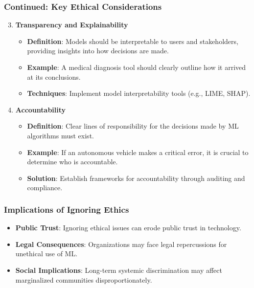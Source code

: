 \documentclass[aspectratio=169]{beamer}
\begin{document}
\begin{frame}[fragile]
    \frametitle{Continued: Key Ethical Considerations}
    \begin{enumerate}
        \setcounter{enumi}{2}
        \item \textbf{Transparency and Explainability}
            \begin{itemize}
                \item \textbf{Definition}: Models should be interpretable to users and stakeholders, providing insights into how decisions are made.
                \item \textbf{Example}: A medical diagnosis tool should clearly outline how it arrived at its conclusions.
                \item \textbf{Techniques}: Implement model interpretability tools (e.g., LIME, SHAP).
            \end{itemize}

        \item \textbf{Accountability}
            \begin{itemize}
                \item \textbf{Definition}: Clear lines of responsibility for the decisions made by ML algorithms must exist.
                \item \textbf{Example}: If an autonomous vehicle makes a critical error, it is crucial to determine who is accountable.
                \item \textbf{Solution}: Establish frameworks for accountability through auditing and compliance.
            \end{itemize}
    \end{enumerate}
\end{frame}

\begin{frame}[fragile]
    \frametitle{Implications of Ignoring Ethics}
    \begin{itemize}
        \item \textbf{Public Trust}: Ignoring ethical issues can erode public trust in technology.
        \item \textbf{Legal Consequences}: Organizations may face legal repercussions for unethical use of ML.
        \item \textbf{Social Implications}: Long-term systemic discrimination may affect marginalized communities disproportionately.
    \end{itemize}
\end{frame}
\end{document}
